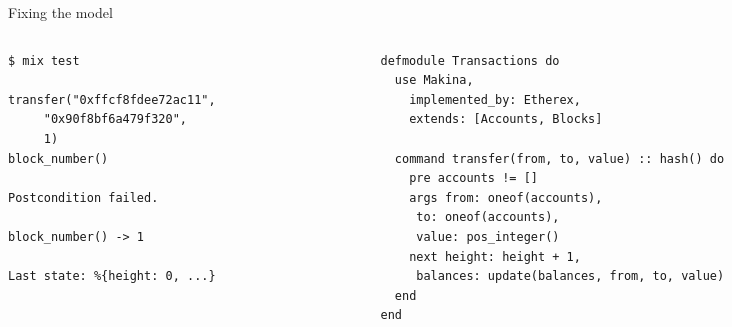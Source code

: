 \documentclass[aspectratio=169, 10pt]{beamer}
\begin{document}
\begin{frame}[label={sec:org8af31fb},fragile]{Fixing the model}
 \begin{columns}
\begin{column}{0.44\columnwidth}
\lstset{language=bash,label= ,caption= ,captionpos=b,numbers=none,style=shell}
\begin{lstlisting}
$ mix test

transfer("0xffcf8fdee72ac11",
	 "0x90f8bf6a479f320",
	 1)
block_number()

Postcondition failed.

block_number() -> 1

Last state: %{height: 0, ...}
\end{lstlisting}
\end{column}

\begin{column}{0.52\columnwidth}
\lstset{language=elixir,label= ,caption= ,captionpos=b,numbers=none,style=display}
\begin{lstlisting}
defmodule Transactions do
  use Makina,
    implemented_by: Etherex,
    extends: [Accounts, Blocks]

  command transfer(from, to, value) :: hash() do
    pre accounts != []
    args from: oneof(accounts),
	 to: oneof(accounts),
	 value: pos_integer()
    next height: height + 1,
	 balances: update(balances, from, to, value)
  end
end
\end{lstlisting}
\end{column}
\end{columns}
\end{frame}
\end{document}
